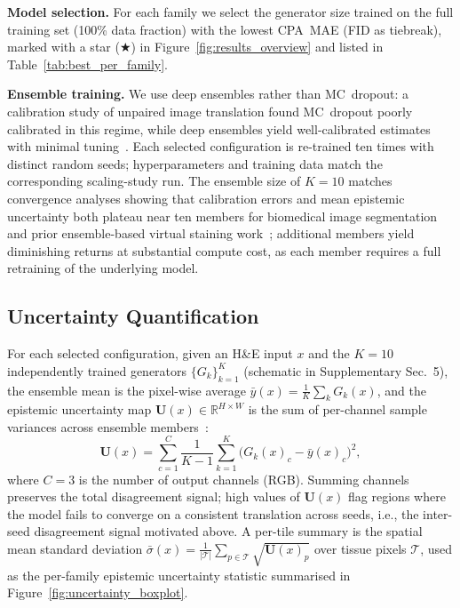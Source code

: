 \noindent\textbf{Model selection.}
For each family we select the generator size trained on the full training set (100\%
data fraction) with the lowest CPA~MAE (FID as tiebreak), marked with a star
($\bigstar$) in Figure~\ref{fig:results_overview} and listed in
Table~\ref{tab:best_per_family}.

\noindent\textbf{Ensemble training.}
We use deep ensembles rather than MC~dropout: a calibration study of unpaired image
translation found MC~dropout poorly calibrated in this regime, while deep ensembles
yield well-calibrated estimates with minimal
tuning~\cite{trustworthy_i2i2025, lakshminarayanan2017simple}.
Each selected configuration is re-trained ten times with distinct random seeds;
hyperparameters and training data match the corresponding scaling-study run.
The ensemble size of $K{=}10$ matches convergence analyses showing that calibration
errors and mean epistemic uncertainty both plateau near ten members for biomedical image
segmentation~\cite{siddiqui2024uncertainty} and prior ensemble-based virtual staining
work~\cite{insilicolabeling2023}; additional members yield diminishing returns
at substantial compute cost, as each member requires a full retraining of the
underlying model.

\subsection{Uncertainty Quantification}
\label{sec:uncertainty_quantification}

For each selected configuration, given an H\&E input $x$ and the $K{=}10$
independently trained generators $\{G_k\}_{k=1}^{K}$ (schematic in Supplementary
Sec.~5), the ensemble mean is the pixel-wise average
$\bar{y}(x) = \frac{1}{K}\sum_{k} G_k(x)$, and the epistemic uncertainty map
$\mathbf{U}(x) \in \mathbb{R}^{H \times W}$ is the sum of per-channel sample variances
across ensemble members~\cite{lakshminarayanan2017simple}:
\begin{equation}
  \mathbf{U}(x) = \sum_{c=1}^{C} \frac{1}{K-1}
  \sum_{k=1}^{K} \bigl(G_k(x)_{c} - \bar{y}(x)_{c}\bigr)^{2},
  \label{eq:uncertainty}
\end{equation}
where $C{=}3$ is the number of output channels (RGB).
Summing channels preserves the total disagreement signal; high values of
$\mathbf{U}(x)$ flag regions where the model fails to converge on a consistent
translation across seeds, i.e., the inter-seed disagreement signal motivated above.
A per-tile summary is the spatial mean standard deviation
$\bar{\sigma}(x) = \frac{1}{|\mathcal{T}|}\sum_{p \in \mathcal{T}} \sqrt{\mathbf{U}(x)_p}$
over tissue pixels $\mathcal{T}$, used as the per-family epistemic uncertainty
statistic summarised in Figure~\ref{fig:uncertainty_boxplot}.

